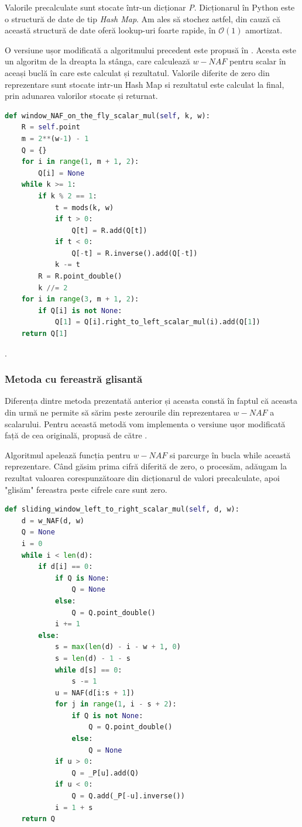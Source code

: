 Valorile precalculate sunt stocate într-un dicționar \textit{P}. Dicționarul în Python este o structură de date de tip \textit{Hash Map}. Am ales să stochez astfel, din cauză că această structură de date oferă lookup-uri foarte rapide, în $\mathcal{O}(1)$ amortizat.

O versiune ușor modificată a algoritmului precedent este propusă în \cite{sliding2}. Acesta este un algoritm de la dreapta la stânga, care calculează $w-NAF$ pentru scalar în aceași buclă în care este calculat și rezultatul. Valorile diferite de zero din reprezentare sunt stocate intr-un Hash Map si rezultatul este calculat la final, prin adunarea valorilor stocate și returnat.

\begin{lstlisting}[language=Python]
def window_NAF_on_the_fly_scalar_mul(self, k, w):
    R = self.point
    m = 2**(w-1) - 1
    Q = {}
    for i in range(1, m + 1, 2):
        Q[i] = None
    while k >= 1:
        if k % 2 == 1:
            t = mods(k, w)
            if t > 0:
                Q[t] = R.add(Q[t])
            if t < 0:
                Q[-t] = R.inverse().add(Q[-t])
            k -= t
        R = R.point_double()
        k //= 2
    for i in range(3, m + 1, 2):
        if Q[i] is not None:
            Q[1] = Q[i].right_to_left_scalar_mul(i).add(Q[1])
    return Q[1]
\end{lstlisting}.

\subsubsection{Metoda cu fereastră glisantă}

Diferența dintre metoda prezentată anterior și aceasta constă în faptul că aceasta din urmă ne permite să sărim peste zerourile din reprezentarea $w-NAF$ a scalarului. Pentru această metodă vom implementa o versiune ușor modificată față de cea originală, propusă de către \cite{sliding}.

Algoritmul apelează funcția pentru $w-NAF$ si parcurge în bucla while această reprezentare. Când găsim prima cifră diferită de zero, o procesăm, adăugam la rezultat valoarea corespunzătoare din dicționarul de valori precalculate, apoi "glisăm" fereastra peste cifrele care sunt zero.

\begin{lstlisting}[language=Python]
def sliding_window_left_to_right_scalar_mul(self, d, w):
    d = w_NAF(d, w)
    Q = None
    i = 0
    while i < len(d):
        if d[i] == 0:
            if Q is None:
                Q = None
            else:
                Q = Q.point_double()
            i += 1
        else:
            s = max(len(d) - i - w + 1, 0)
            s = len(d) - 1 - s
            while d[s] == 0:
                s -= 1
            u = NAF(d[i:s + 1])
            for j in range(1, i - s + 2):
                if Q is not None:
                    Q = Q.point_double()
                else:
                    Q = None
            if u > 0:
                Q = _P[u].add(Q)
            if u < 0:
                Q = Q.add(_P[-u].inverse())
            i = 1 + s
    return Q
\end{lstlisting}

